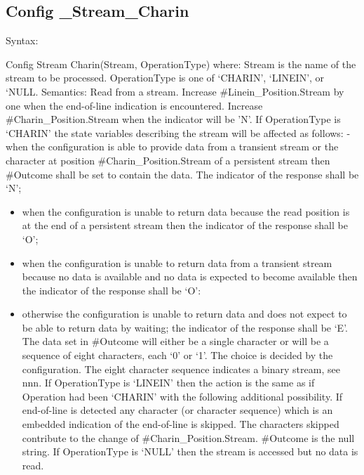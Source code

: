 \hypertarget{config-_stream_charin}{%
\subsection{Config \_Stream\_Charin}\label{config-_stream_charin}}

Syntax:

Config Stream Charin(Stream, OperationType) where: Stream is the name of
the stream to be processed. OperationType is one of `CHARIN', `LINEIN',
or `NULL. Semantics: Read from a stream. Increase
\#Linein\_Position.Stream by one when the end-of-line indication is
encountered. Increase \#Charin\_Position.Stream when the indicator will
be 'N'. If OperationType is `CHARIN' the state variables describing the
stream will be affected as follows: - when the configuration is able to
provide data from a transient stream or the character at position
\#Charin\_Position.Stream of a persistent stream then \#Outcome shall be
set to contain the data. The indicator of the response shall be `N';

\begin{itemize}
\tightlist
\item
  when the configuration is unable to return data because the read
  position is at the end of a persistent stream then the indicator of
  the response shall be `O';
\item
  when the configuration is unable to return data from a transient
  stream because no data is available and no data is expected to become
  available then the indicator of the response shall be `O':
\item
  otherwise the configuration is unable to return data and does not
  expect to be able to return data by waiting; the indicator of the
  response shall be `E'. The data set in \#Outcome will either be a
  single character or will be a sequence of eight characters, each `0'
  or `1'. The choice is decided by the configuration. The eight
  character sequence indicates a binary stream, see nnn. If
  OperationType is `LINEIN' then the action is the same as if Operation
  had been `CHARIN' with the following additional possibility. If
  end-of-line is detected any character (or character sequence) which is
  an embedded indication of the end-of-line is skipped. The characters
  skipped contribute to the change of \#Charin\_Position.Stream.
  \#Outcome is the null string. If OperationType is `NULL' then the
  stream is accessed but no data is read.
\end{itemize}

